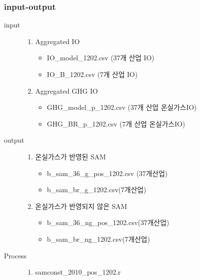 \documentclass{beamer}
\begin{document}
		
\begin{frame}
	\frametitle{input-output}

		\begin{description}
			\item[input]
			\begin{enumerate}
			\item{Aggregated IO}
				\begin{itemize}
				\item{IO\_model\_1202.csv (37개 산업 IO)}
				\item{IO\_B\_1202.csv (7개 산업 IO)}
				\end{itemize}
			\item{Aggregated GHG IO}
				\begin{itemize}
				\item{GHG\_model\_p\_1202.csv (37개 산업 온실가스IO)}   
				\item{GHG\_BR\_p\_1202.csv (7개 산업 온실가스IO)}
				\end{itemize}
			\end{enumerate}
			\item[output]
				\begin{enumerate}
					\item{온실가스가 반영된 SAM} 
					\begin{itemize}
					\item{b\_sam\_36\_g\_pos\_1202.csv (37개산업)}
					\item{b\_sam\_br\_g\_1202.csv(7개산업)}
					\end{itemize}
					\item{온실가스가 반영되지 않은 SAM}
					\begin{itemize}
					\item{b\_sam\_36\_ng\_pos\_1202.csv(37개산업)}
					\item{b\_sam\_br\_ng\_1202.csv(7개산업)}
					\end{itemize} 
				\end{enumerate}
			\item[Process]
				\begin{enumerate}
					\item{samconst\_2010\_pos\_1202.r}				
				\end{enumerate}
					
		\end{description}
\end{frame}
\end{document}
